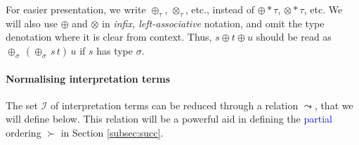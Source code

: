 \documentclass[a4paper,UKenglish,cleveref,autoref,numberwithinsect]{lipics-v2019}
\theoremstyle{definition}
\newcommand{\Iterms}{\mathcal{I}}
\newcommand{\tapp}[2]{#1 * #2}
\newcommand{\arrW}{\leadsto}
\newcommand{\CKchange}[1]{\textcolor{blue}{#1}}
\begin{document}
For easier presentation, we write $\oplus_\tau$, $\otimes_\tau$, etc.,
instead of $\tapp{\oplus}{\tau}$, $\tapp{\otimes}{\tau}$, etc. We will
also use $\oplus$ and $\otimes$ in \emph{infix, left-associative}
notation, and omit the type denotation where it is clear from
context. Thus, $s \oplus t \oplus u$ should be read as
$\oplus_\sigma\,(\oplus_\sigma\,s\,t)\,u$ if $s$ has type $\sigma$.

\paragraph*{Normalising interpretation terms}

The set $\Iterms$ of interpretation terms can be reduced through
a relation $\arrW$, that we will define below.  This relation will
be a powerful aid in defining the \CKchange{partial} ordering $\succ$ in Section
\ref{subsec:succ}.
\end{document}
